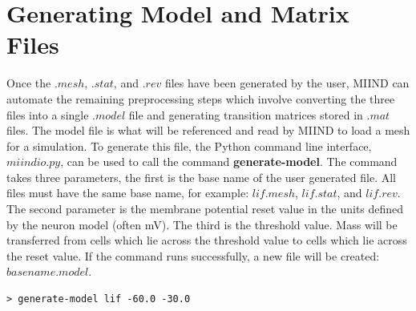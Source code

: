 \documentclass[utf8]{frontiersSCNS} %
\begin{document}
\section{Generating Model and Matrix Files}
\label{generatemodelmatfiles}
Once the $.mesh$, $.stat$, and $.rev$ files have been generated by the user, MIIND can automate the remaining preprocessing steps which involve converting the three files into a single $.model$ file and generating transition matrices stored in $.mat$ files. The model file is what will be referenced and read by MIIND to load a mesh for a simulation. To generate this file, the Python command line interface, $miindio.py$, can be used to call the command \textbf{generate-model}. The command takes three parameters, the first is the base name of the user generated file. All files must have the same base name, for example: $lif.mesh$, $lif.stat$, and $lif.rev$. The second parameter is the membrane potential reset value in the units defined by the neuron model (often mV). The third is the threshold value. Mass will be transferred from cells which lie across the threshold value to cells which lie across the reset value. If the command runs successfully, a new file will be created: $basename.model$.

\begin{lstlisting}[language=xml]
> generate-model lif -60.0 -30.0
\end{lstlisting}
\end{document}

